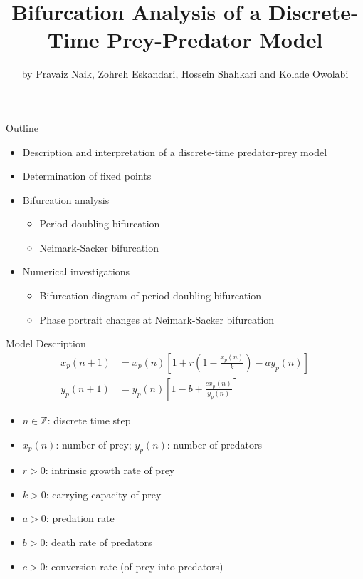 \documentclass[]{beamer}
\title{Bifurcation Analysis of a Discrete-Time Prey-Predator Model}
\author{by Pravaiz Naik, Zohreh Eskandari, Hossein Shahkari and Kolade Owolabi}
\institute{Presented by Jacob Hauck}
\date{}
\begin{document}
	\frame{\titlepage}
	
	\begin{frame}{Outline}
		\begin{itemize}
			\item Description and interpretation of a discrete-time predator-prey model
			\vfill
			
			\item Determination of fixed points
			\vfill
			
			\item Bifurcation analysis
			\begin{itemize}
				\item Period-doubling bifurcation
				\item Neimark-Sacker bifurcation
			\end{itemize}
			\vfill
			
			\item Numerical investigations
			\begin{itemize}
				\item Bifurcation diagram of period-doubling bifurcation
				\item Phase portrait changes at Neimark-Sacker bifurcation
			\end{itemize}
		\end{itemize}
	\end{frame}
	
	\begin{frame}{Model Description}
		\begin{align*}
			x_p(n+1) &= x_p(n)\left[1 + r\left(1 - \frac{x_p(n)}{k}\right) - ay_p(n)\right] \\[0.3em]
			y_p(n+1) &= y_p(n)\left[1 - b + \frac{cx_p(n)}{y_p(n)}\right]
		\end{align*}
		\begin{itemize}
			\item $n \in \mathbb{Z}$: discrete time step
			\item $x_p(n)$: number of prey; $y_p(n)$: number of predators
			\item $r > 0$: intrinsic growth rate of prey
			\item $k > 0$: carrying capacity of prey
			\item $a > 0$: predation rate
			\item $b > 0$: death rate of predators
			\item $c > 0$: conversion rate (of prey into predators)
		\end{itemize}
	\end{frame}
	
\end{document}
